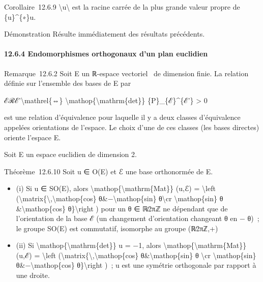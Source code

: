 \documentclass[]{article}
\begin{document}
Corollaire~12.6.9 \textbackslash{}\textbar{}u\textbackslash{}\textbar{}
est la racine carrée de la plus grande valeur propre de \{u\}\^{}\{∗\}u.

Démonstration Résulte immédiatement des résultats précédents.

\paragraph{12.6.4 Endomorphismes orthogonaux d'un plan euclidien}

Remarque~12.6.2 Soit E un ℝ-espace vectoriel ~de dimension finie. La
relation définie sur l'ensemble des bases de E par

ℰℛℰ'\textbackslash{}mathrel\{⇔\}
\textbackslash{}mathop\{\textbackslash{}mathrm\{det\}\}
\{P\}\_\{ℰ\}\^{}\{ℰ'\} \textgreater{} 0

est une relation d'équivalence pour laquelle il y a deux classes
d'équivalence appelées orientations de l'espace. Le choix d'une de ces
classes (les bases directes) oriente l'espace E.

Soit E un espace euclidien de dimension 2.

Théorème~12.6.10 Soit u ∈ O(E) et ℰ une base orthonormée de E.

\begin{itemize}
\itemsep1pt\parskip0pt
\item
  (i) Si u ∈ SO(E), alors
  \textbackslash{}mathop\{\textbackslash{}mathrm\{Mat\}\} (u,ℰ) =
  \textbackslash{}left
  (\textbackslash{}matrix\{\textbackslash{},\textbackslash{}mathop\{cos\}
  θ\&−\textbackslash{}mathop\{sin\} θ\textbackslash{}cr
  \textbackslash{}mathop\{sin\} θ \&\textbackslash{}mathop\{cos\}
  θ\}\textbackslash{}right ) pour un θ ∈ ℝ∕2πℤ ne dépendant que de
  l'orientation de la base ℰ (un changement d'orientation changeant θ en
  − θ)~; le groupe SO(E) est commutatif, isomorphe au groupe (ℝ∕2πℤ,+)
\item
  (ii) Si \textbackslash{}mathop\{\textbackslash{}mathrm\{det\}\} u =
  −1, alors \textbackslash{}mathop\{\textbackslash{}mathrm\{Mat\}\}
  (u,ℰ) = \textbackslash{}left
  (\textbackslash{}matrix\{\textbackslash{},\textbackslash{}mathop\{cos\}
  θ\&\textbackslash{}mathop\{sin\} θ \textbackslash{}cr
  \textbackslash{}mathop\{sin\} θ\&−\textbackslash{}mathop\{cos\}
  θ\}\textbackslash{}right )~; u est une symétrie orthogonale par
  rapport à une droite.
\end{itemize}
\end{document}
